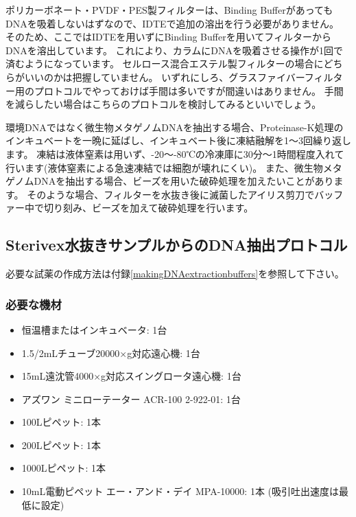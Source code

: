 \documentclass[titlepage,10pt,a4paper,uplatex]{jsbook}
\begin{document}
ポリカーボネート・PVDF・PES製フィルターは、Binding BufferがあってもDNAを吸着しないはずなので、IDTEで追加の溶出を行う必要がありません。
そのため、ここではIDTEを用いずにBinding Bufferを用いてフィルターからDNAを溶出しています。
これにより、カラムにDNAを吸着させる操作が1回で済むようになっています。
セルロース混合エステル製フィルターの場合にどちらがいいのかは把握していません。
いずれにしろ、グラスファイバーフィルター用のプロトコルでやっておけば手間は多いですが間違いはありません。
手間を減らしたい場合はこちらのプロトコルを検討してみるといいでしょう。

環境DNAではなく微生物メタゲノムDNAを抽出する場合、Proteinase-K処理のインキュベートを一晩に延ばし、インキュベート後に凍結融解を1～3回繰り返します。
凍結は液体窒素は用いず、{-20}～{-80}℃の冷凍庫に30分～1時間程度入れて行います(液体窒素による急速凍結では細胞が壊れにくい)。
また、微生物メタゲノムDNAを抽出する場合、ビーズを用いた破砕処理を加えたいことがあります。
そのような場合、フィルターを水抜き後に滅菌したアイリス剪刀でバッファー中で切り刻み、ビーズを加えて破砕処理を行います。

\subsection{Sterivex水抜きサンプルからのDNA抽出プロトコル}

必要な試薬の作成方法は付録\ref{makingDNAextractionbuffers}を参照して下さい。

\subsubsection{必要な機材}
\begin{itemize}
\item 恒温槽またはインキュベータ: 1台
\item 1.5/2mLチューブ20000×g対応遠心機: 1台
\item 15mL遠沈管4000×g対応スイングロータ遠心機: 1台
\item アズワン ミニローテーター ACR-100 2-922-01: 1台
\item 100{\textmu}Lピペット: 1本
\item 200{\textmu}Lピペット: 1本
\item 1000{\textmu}Lピペット: 1本
\item 10mL電動ピペット エー・アンド・デイ MPA-10000: 1本 (吸引吐出速度は最低に設定)
\end{itemize}
\end{document}
